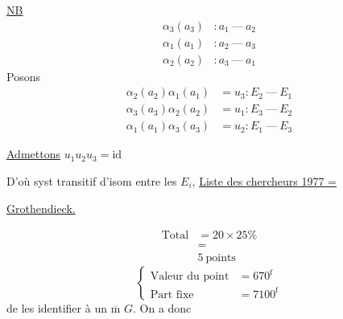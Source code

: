 \uline{NB}
\[
\begin{aligned}
\alpha_3(a_3)&:a_1\ \text{---}\ a_2\\
\alpha_1(a_1)&:a_2\ \text{---}\ a_3\\
\alpha_2(a_2)&:a_3\ \text{---}\ a_1
\end{aligned}
\]
 Posons
\[
\begin{aligned}
\alpha_2(a_2)\alpha_1(a_1)&=u_3:E_2\ \text{---}\ E_1\\
\alpha_3(a_3)\alpha_2(a_2)&=u_1:E_3\ \text{---}\ E_2\\
\alpha_1(a_1)\alpha_3(a_3)&=u_2:E_1\ \text{---}\ E_3
\end{aligned}
\]

\uline{Admettons} \qquad $\boxed{u_1 u_2 u_3=\mathrm{id}}$


D'où syst transitif d'isom entre les $E_i$,
\uline{Liste des chercheurs 1977 =}

\uline{ Grothendieck.}

\[
\begin{aligned}
\text{Total}&=20\times25\%\\
&=\\[-.2em]
&\boxed{5\ \text{points}}
\end{aligned}
\]
\[
\left\{\begin{aligned}
\text{Valeur du point}&=670^{\mathrm f}\\
\text{Part fixe}&=7100^{\mathrm f}
\end{aligned}\right.
\]
  de les identifier à un $\overline{\mathrm m}$ $G$. On a donc

